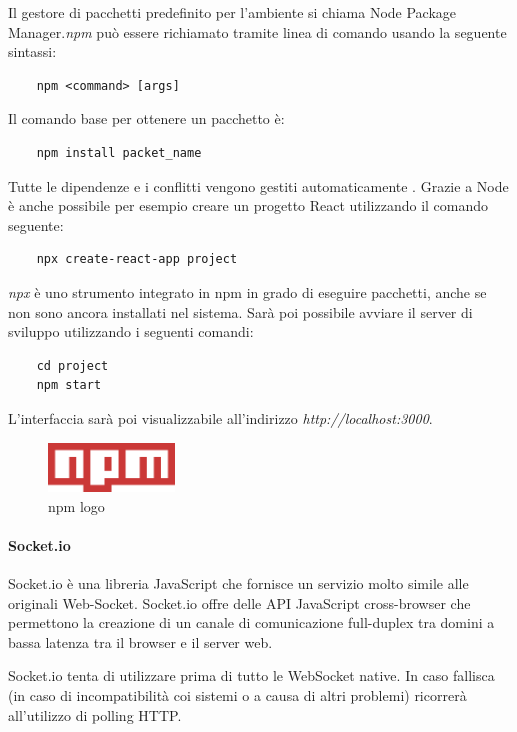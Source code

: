 Il gestore di pacchetti predefinito per l'ambiente si chiama Node Package Manager.\emph{npm} può essere richiamato tramite linea di comando usando la seguente sintassi:
\begin{verbatim}
    npm <command> [args]
\end{verbatim}
Il comando base per ottenere un pacchetto è:
\begin{verbatim}
    npm install packet_name
\end{verbatim}
Tutte le dipendenze e i conflitti vengono gestiti automaticamente \cite{npmDoc}. Grazie a Node è anche possibile per esempio creare un progetto React utilizzando il comando seguente:
\begin{verbatim}
    npx create-react-app project
\end{verbatim}
\emph{npx} è uno strumento integrato in npm in grado di eseguire pacchetti, anche se non sono ancora installati nel sistema.
Sarà poi possibile avviare il server di sviluppo utilizzando i seguenti comandi:
\begin{verbatim}
    cd project
    npm start
\end{verbatim}
L'interfaccia sarà poi visualizzabile all'indirizzo \emph{http://localhost:3000}.

\begin{figure}[H]
\centering
\includegraphics[width=0.3\textwidth]{img/logos/npm_logo.png}
\caption{npm logo}
\label{fig:npm}
\end{figure}

\paragraph{Socket.io}
Socket.io è una libreria JavaScript che fornisce un servizio molto simile alle originali Web-Socket. Socket.io offre delle API JavaScript cross-browser che permettono la creazione di un canale di comunicazione full-duplex tra domini a bassa latenza tra il browser e il server web.

Socket.io tenta di utilizzare prima di tutto le WebSocket native. In caso fallisca (in caso di incompatibilità coi sistemi o a causa di altri problemi)
ricorrerà all'utilizzo di polling HTTP.

